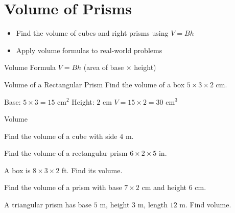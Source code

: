 \section{Volume of Prisms}

\begin{learningGoals}
\begin{itemize}
    \item Find the volume of cubes and right prisms using $V = Bh$
    \item Apply volume formulas to real-world problems
\end{itemize}
\end{learningGoals}

\begin{conceptBox}{Volume Formula}
$V = Bh$ (area of base $\times$ height)
\end{conceptBox}

\begin{workedExample}{Volume of a Rectangular Prism}
Find the volume of a box $5 \times 3 \times 2$ cm.

Base: $5 \times 3 = 15$ cm$^2$
Height: $2$ cm
$V = 15 \times 2 = 30$ cm$^3$
\end{workedExample}


\begin{practiceBox}{Volume}
\resetProblems

\prob Find the volume of a cube with side $4$ m.

\prob Find the volume of a rectangular prism $6 \times 2 \times 5$ in.

\prob A box is $8 \times 3 \times 2$ ft. Find its volume.

\prob Find the volume of a prism with base $7 \times 2$ cm and height $6$ cm.

\prob A triangular prism has base $5$ m, height $3$ m, length $12$ m. Find volume.

\end{practiceBox}
